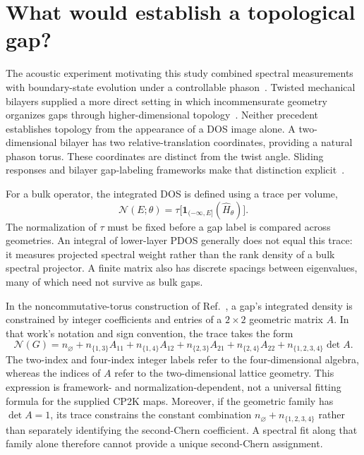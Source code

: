 \documentclass[aps,prl,10pt,onecolumn,superscriptaddress,longbibliography]{revtex4-2}
\begin{document}
\section{What would establish a topological gap?}

The acoustic experiment motivating this study combined spectral measurements with boundary-state evolution under a controllable phason~\cite{ni2019}. Twisted mechanical bilayers supplied a more direct setting in which incommensurate geometry organizes gaps through higher-dimensional topology~\cite{rosa2021}. Neither precedent establishes topology from the appearance of a DOS image alone. A two-dimensional bilayer has two relative-translation coordinates, providing a natural phason torus. These coordinates are distinct from the twist angle. Sliding responses and bilayer gap-labeling frameworks make that distinction explicit~\cite{su2020,fujimoto2020,yoshii2023}.

For a bulk operator, the integrated DOS is defined using a trace per volume,
\begin{equation}
 \mathcal N(E;\theta)=\tau\bigl[\mathbf1_{(-\infty,E]}(\hat H_\theta)\bigr].
\end{equation}
The normalization of $\tau$ must be fixed before a gap label is compared across geometries. An integral of lower-layer PDOS generally does not equal this trace: it measures projected spectral weight rather than the rank density of a bulk spectral projector. A finite matrix also has discrete spacings between eigenvalues, many of which need not survive as bulk gaps.

In the noncommutative-torus construction of Ref.~\cite{rosa2021}, a gap's integrated density is constrained by integer coefficients and entries of a $2\times2$ geometric matrix $A$. In that work's notation and sign convention, the trace takes the form
\begin{equation}
 \mathcal N(G)=n_{\varnothing}+n_{\{1,3\}}A_{11}
 +n_{\{1,4\}}A_{12}+n_{\{2,3\}}A_{21}
 +n_{\{2,4\}}A_{22}+n_{\{1,2,3,4\}}\det A.
\end{equation}
The two-index and four-index integer labels refer to the four-dimensional algebra, whereas the indices of $A$ refer to the two-dimensional lattice geometry. This expression is framework- and normalization-dependent, not a universal fitting formula for the supplied CP2K maps. Moreover, if the geometric family has $\det A=1$, its trace constrains the constant combination $n_{\varnothing}+n_{\{1,2,3,4\}}$ rather than separately identifying the second-Chern coefficient. A spectral fit along that family alone therefore cannot provide a unique second-Chern assignment.
\end{document}
